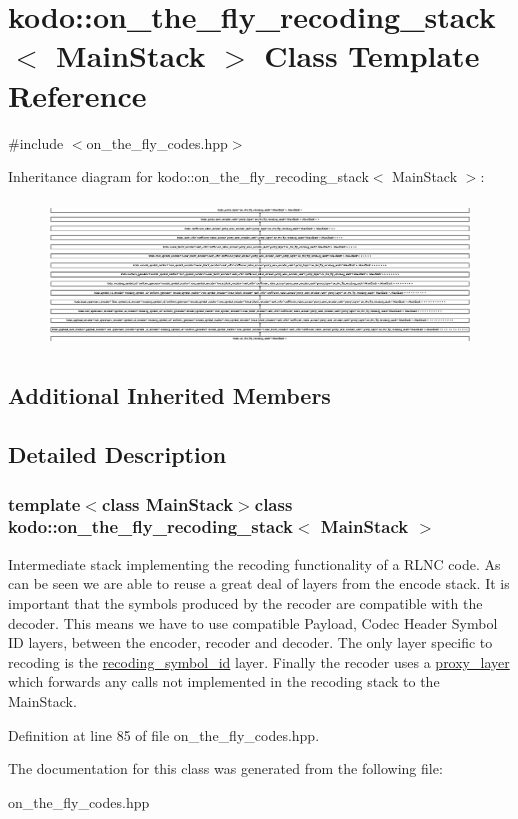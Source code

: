 \hypertarget{classkodo_1_1on__the__fly__recoding__stack}{\section{kodo\-:\-:on\-\_\-the\-\_\-fly\-\_\-recoding\-\_\-stack$<$ Main\-Stack $>$ Class Template Reference}
\label{classkodo_1_1on__the__fly__recoding__stack}
}


{\ttfamily \#include $<$on\-\_\-the\-\_\-fly\-\_\-codes.\-hpp$>$}

Inheritance diagram for kodo\-:\-:on\-\_\-the\-\_\-fly\-\_\-recoding\-\_\-stack$<$ Main\-Stack $>$\-:\begin{figure}[H]
\begin{center}
\leavevmode
\includegraphics[height=3.883495cm]{classkodo_1_1on__the__fly__recoding__stack}
\end{center}
\end{figure}
\subsection*{Additional Inherited Members}


\subsection{Detailed Description}
\subsubsection*{template$<$class Main\-Stack$>$class kodo\-::on\-\_\-the\-\_\-fly\-\_\-recoding\-\_\-stack$<$ Main\-Stack $>$}

Intermediate stack implementing the recoding functionality of a R\-L\-N\-C code. As can be seen we are able to reuse a great deal of layers from the encode stack. It is important that the symbols produced by the recoder are compatible with the decoder. This means we have to use compatible Payload, Codec Header Symbol I\-D layers, between the encoder, recoder and decoder. The only layer specific to recoding is the \hyperlink{classkodo_1_1recoding__symbol__id}{recoding\-\_\-symbol\-\_\-id} layer. Finally the recoder uses a \hyperlink{classkodo_1_1proxy__layer}{proxy\-\_\-layer} which forwards any calls not implemented in the recoding stack to the Main\-Stack. 

Definition at line 85 of file on\-\_\-the\-\_\-fly\-\_\-codes.\-hpp.



The documentation for this class was generated from the following file\-:\begin{DoxyCompactItemize}
\item 
on\-\_\-the\-\_\-fly\-\_\-codes.\-hpp\end{DoxyCompactItemize}
